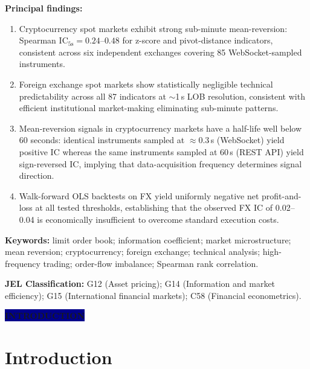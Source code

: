 \documentclass[12pt,a4paper]{article}
\theoremstyle{definition}
\theoremstyle{remark}
\newcommand{\IC}{\mathrm{IC}}
\newcommand{\sectionlabel}[1]{%
  \begin{center}
    \colorbox{darkblue}{\color{white}\bfseries\large\quad #1 \quad}
  \end{center}
  \vspace{4pt}
}
\begin{document}
\medskip
\textbf{Principal findings:}
\begin{enumerate}[leftmargin=1.8em,itemsep=3pt]
  \item Cryptocurrency spot markets exhibit strong sub-minute
    mean-reversion: Spearman $\IC_{5\text{s}} = 0.24$--$0.48$ for
    z-score and pivot-distance indicators, consistent across six
    independent exchanges covering 85 WebSocket-sampled instruments.
  \item Foreign exchange spot markets show statistically negligible
    technical predictability across all 87 indicators at $\sim$1\,s
    LOB resolution, consistent with efficient institutional
    market-making eliminating sub-minute patterns.
  \item Mean-reversion signals in cryptocurrency markets have a
    half-life well below 60 seconds: identical instruments sampled
    at $\approx 0.3$\,s (WebSocket) yield positive IC whereas the
    same instruments sampled at 60\,s (REST API) yield sign-reversed IC,
    implying that data-acquisition frequency determines signal direction.
  \item Walk-forward OLS backtests on FX yield uniformly negative net
    profit-and-loss at all tested thresholds, establishing that the
    observed FX IC of 0.02--0.04 is economically insufficient to
    overcome standard execution costs.
\end{enumerate}

\vspace{0.5cm}
\noindent\textbf{Keywords:} limit order book; information coefficient;
market microstructure; mean reversion; cryptocurrency; foreign exchange;
technical analysis; high-frequency trading; order-flow imbalance;
Spearman rank correlation.

\vspace{0.3cm}
\noindent\textbf{JEL Classification:}
G12 (Asset pricing);
G14 (Information and market efficiency);
G15 (International financial markets);
C58 (Financial econometrics).

\newpage

\renewcommand{\contentsname}{\color{darkblue}Table of Contents}
\tableofcontents
\newpage

\sectionlabel{INTRODUCTION}

\section{Introduction}
\label{sec:intro}
\end{document}
